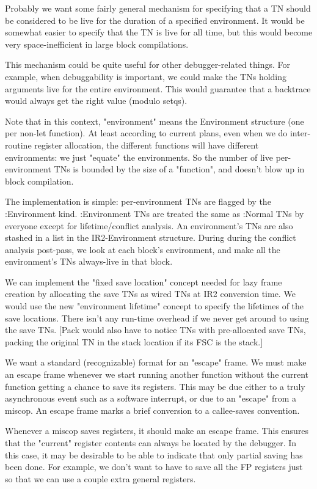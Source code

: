  Probably we want some fairly general
mechanism for specifying that a TN should be considered to be live for the
duration of a specified environment.  It would be somewhat easier to specify
that the TN is live for all time, but this would become very space-inefficient
in large block compilations.

This mechanism could be quite useful for other debugger-related things.  For
example, when debuggability is important, we could make the TNs holding
arguments live for the entire environment.  This would guarantee that a
backtrace would always get the right value (modulo setqs).  

Note that in this context, "environment" means the Environment structure (one
per non-let function).  At least according to current plans, even when we do
inter-routine register allocation, the different functions will have different
environments: we just "equate" the environments.  So the number of live
per-environment TNs is bounded by the size of a "function", and doesn't blow up
in block compilation.

The implementation is simple: per-environment TNs are flagged by the
:Environment kind.  :Environment TNs are treated the same as :Normal TNs by
everyone except for lifetime/conflict analysis.  An environment's TNs are also
stashed in a list in the IR2-Environment structure.  During during the conflict
analysis post-pass, we look at each block's environment, and make all the
environment's TNs always-live in that block.

We can implement the "fixed save location" concept needed for lazy frame
creation by allocating the save TNs as wired TNs at IR2 conversion time.  We
would use the new "environment lifetime" concept to specify the lifetimes of
the save locations.  There isn't any run-time overhead if we never get around
to using the save TNs.  [Pack would also have to notice TNs with pre-allocated
save TNs, packing the original TN in the stack location if its FSC is the
stack.]


We want a standard (recognizable) format for an "escape" frame.  We must make
an escape frame whenever we start running another function without the current
function getting a chance to save its registers.  This may be due either to a
truly asynchronous event such as a software interrupt, or due to an "escape"
from a miscop.  An escape frame marks a brief conversion to a callee-saves
convention.

Whenever a miscop saves registers, it should make an escape frame.  This
ensures that the "current" register contents can always be located by the
debugger.  In this case, it may be desirable to be able to indicate that only
partial saving has been done.  For example, we don't want to have to save all
the FP registers just so that we can use a couple extra general registers.

